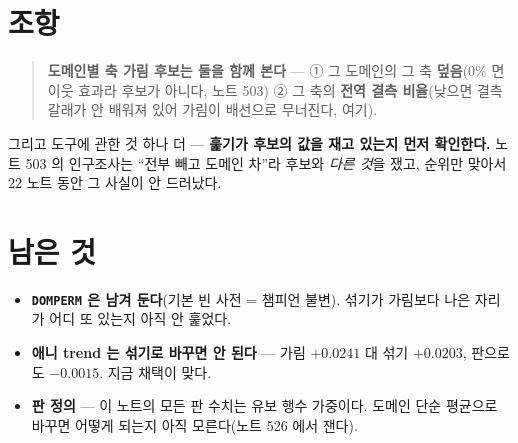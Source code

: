 \documentclass[11pt]{article}
\begin{document}
\section*{조항}

\begin{quote}
\textbf{도메인별 축 가림 후보는 둘을 함께 본다} --- ① 그 도메인의 그 축
\textbf{덮음}($0\%$ 면 이웃 효과라 후보가 아니다, 노트 503) ② 그 축의
\textbf{전역 결측 비율}(낮으면 결측 갈래가 안 배워져 있어 가림이 배선으로
무너진다, 여기).
\end{quote}

그리고 도구에 관한 것 하나 더 --- \textbf{훑기가 후보의 값을 재고 있는지
먼저 확인한다.} 노트 503 의 인구조사는 ``전부 빼고 도메인 차''라 후보와
\emph{다른 것}을 쟀고, 순위만 맞아서 $22$ 노트 동안 그 사실이 안 드러났다.

\section*{남은 것}

\begin{itemize}
\item \textbf{\texttt{DOMPERM} 은 남겨 둔다}(기본 빈 사전 = 챔피언 불변).
섞기가 가림보다 나은 자리가 어디 또 있는지 아직 안 훑었다.
\item \textbf{애니 trend 는 섞기로 바꾸면 안 된다} --- 가림 $+0.0241$ 대
섞기 $+0.0203$, 판으로도 $-0.0015$. 지금 채택이 맞다.
\item \textbf{판 정의} --- 이 노트의 모든 판 수치는 유보 행수 가중이다.
도메인 단순 평균으로 바꾸면 어떻게 되는지 아직 모른다(노트 526 에서 잰다).
\end{itemize}
\end{document}
